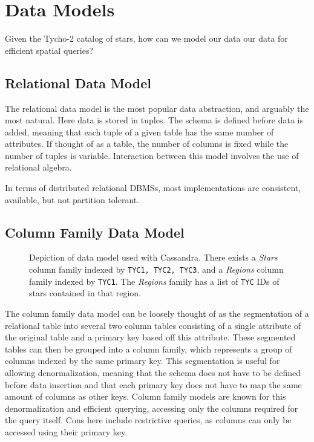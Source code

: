\section{Data Models}\label{sec:dataModels}
Given the Tycho-2 catalog of stars, how can we model our data our data for efficient spatial queries?

\subsection{Relational Data Model}\label{subsec:relationalDataModel}
The relational data model is the most popular data abstraction, and arguably the most natural.
Here data is stored in tuples.
The schema is defined before data is added, meaning that each tuple of a given table has the same number of attributes.
If thought of as a table, the number of columns is fixed while the number of tuples is variable.
Interaction between this model involves the use of relational algebra.

In terms of distributed relational DBMSs, most implementations are consistent, available, but not partition tolerant.

\subsection{Column Family Data Model}\label{subsec:columnFamilyDataModel}
\begin{figure}
    \caption{Depiction of data model used with Cassandra.
    There exists a \textit{Stars} column family indexed by \texttt{TYC1, TYC2, TYC3}, and a \textit{Regions} column
    family indexed by \texttt{TYC1}.
    The \textit{Regions} family has a list of \texttt{TYC} IDs of stars contained in that region.}
    \label{fig:cassandraDataModel}
\end{figure}

The column family data model can be loosely thought of as the segmentation of a relational table into several two
column tables consisting of a single attribute of the original table and a primary key based off this attribute.
These segmented tables can then be grouped into a column family, which represents a group of columns indexed by the
same primary key.
This segmentation is useful for allowing denormalization, meaning that the schema does not have to be defined before
data insertion and that each primary key does not have to map the same amount of columns as other keys.
Column family models are known for this denormalization and efficient querying, accessing only the columns required for
the query itself.
Cons here include restrictive queries, as columns can only be accessed using their primary key.


